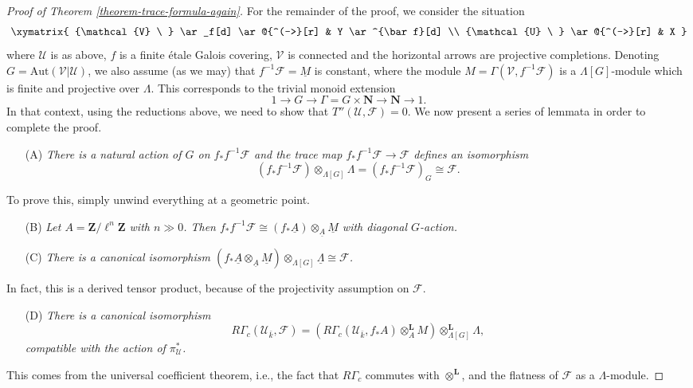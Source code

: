 \begin{proof}[Proof of Theorem \ref{theorem-trace-formula-again}]
\medskip\noindent
For the remainder of the proof, we consider the situation
$$
\xymatrix{
{\mathcal{V} \ } \ar_f[d] \ar@{^(->}[r] & Y \ar^{\bar f}[d] \\	
{\mathcal{U} \ } \ar@{^(->}[r] & X
}
$$
where $\mathcal{U}$ is as above, $f$ is a finite \'etale Galois covering,
$\mathcal{V}$ is connected and the horizontal arrows are projective
completions. Denoting $G=\text{Aut}(\mathcal{V}|\mathcal{U})$, we also assume
(as we may) that $f^{-1}\mathcal{F} =\underline M$ is constant, where the
module $M = \Gamma(\mathcal{V}, f^{-1}\mathcal{F})$ is a $\Lambda[G]$-module
which is finite and projective over $\Lambda$. This corresponds to the trivial
monoid extension
$$
1\to G\to \Gamma=G \times \mathbf{N}\to \mathbf{N}\to 1.
$$
In that context, using the reductions above, we need to show that
$T''(\mathcal{U}, \mathcal{F})=0$. We now present a series of lemmata in order
to complete the proof.
\begin{enumerate}
\item[(A)]
{\it There is a natural action of $G$ on $f_*f^{-1}\mathcal{F}$ and the trace
map $f_*f^{-1}\mathcal{F}\to \mathcal{F}$ defines an isomorphism
$$
(f_*f^{-1}\mathcal{F})\otimes_{\Lambda[G]} \Lambda=(f_*f^{-1}\mathcal{F})_G
\cong \mathcal{F}.
$$
}
\end{enumerate}
To prove this, simply unwind everything at a geometric point.
\begin{enumerate}
\item[(B)]
{\it
Let $A=\mathbf{Z}/\ell^n \mathbf{Z}$ with $n\gg 0$. Then $f_*f^{-1}\mathcal{F}
\cong (f_*\underline A)\otimes_{\underline A} \underline M$ with diagonal
$G$-action.
}
\end{enumerate}
\begin{enumerate}
\item[(C)]
{\it There is a canonical isomorphism
$(f_*\underline A \otimes_{\underline A} \underline M)
\otimes_{\Lambda[G]} \underline \Lambda \cong \mathcal{F}$.
}
\end{enumerate}
In fact, this is a derived tensor product, because of the projectivity
assumption on $\mathcal{F}$.
\begin{enumerate}
\item[(D)]
{\it
There is a canonical isomorphism
$$
R\Gamma_c(\mathcal{U}_{\bar k}, \mathcal{F})
= (R\Gamma_c(\mathcal{U}_{\bar k}, f_*A)\otimes_A^\mathbf{L}
M)\otimes_{\Lambda[G]}^\mathbf{L} \Lambda,
$$
compatible with the action of $\pi^*_\mathcal{U}$.
}
\end{enumerate}
This comes from the universal coefficient theorem, i.e., the fact that
$R\Gamma_c$ commutes with $\otimes^\mathbf{L}$, and the flatness of
$\mathcal{F}$ as a $\Lambda$-module.


\end{proof}
